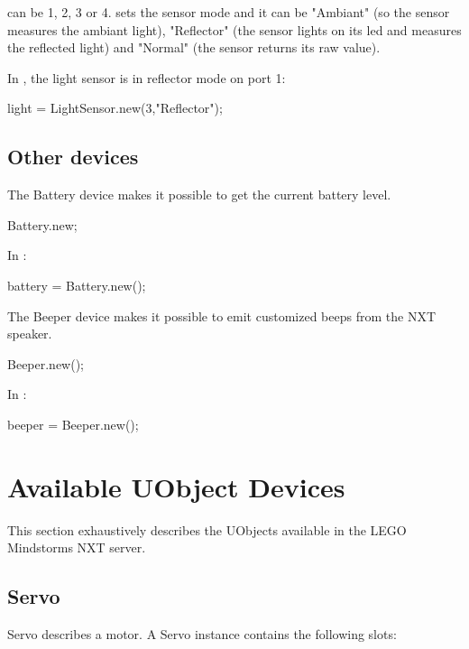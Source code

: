  can be 1, 2, 3 or 4.  sets the sensor mode and it can
be "Ambiant" (so the sensor measures the ambiant light), "Reflector" (the
sensor lights on its led and measures the reflected light) and "Normal" (the
sensor returns its raw value).

In , the light sensor is in reflector mode on port 1:
\begin{urbiunchecked}
  light = LightSensor.new(3,"Reflector");
\end{urbiunchecked}


\subsection{Other devices}
The Battery device makes it possible to get the current battery level.
\begin{urbiunchecked}
Battery.new;
\end{urbiunchecked}

In :
\begin{urbiunchecked}
battery = Battery.new();
\end{urbiunchecked}

The Beeper device makes it possible to emit customized beeps from the NXT
speaker.
\begin{urbiunchecked}
Beeper.new();
\end{urbiunchecked}

In :
\begin{urbiunchecked}
beeper = Beeper.new();
\end{urbiunchecked}


\section{Available UObject Devices}
\label{sec:nxt:specs}
This section exhaustively describes the UObjects available in the LEGO
Mindstorms NXT \urbi server.

\subsection{Servo}
Servo describes a motor. A Servo instance contains the following slots:

